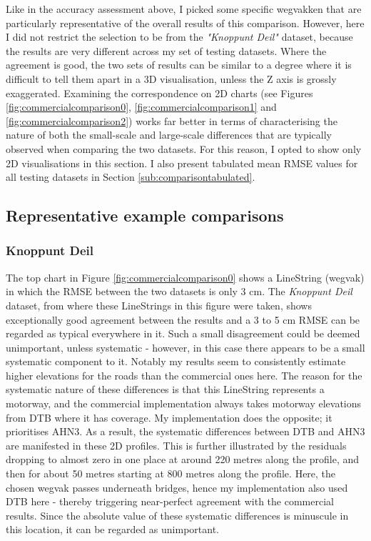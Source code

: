 Like in the accuracy assessment above, I picked some specific wegvakken that are particularly representative of the overall results of this comparison. However, here I did not restrict the selection to be from the \textit{"Knoppunt Deil"} dataset, because the results are very different across my set of testing datasets. Where the agreement is good, the two sets of results can be similar to a degree where it is difficult to tell them apart in a 3D visualisation, unless the Z axis is grossly exaggerated. Examining the correspondence on 2D charts (see Figures \ref{fig:commercialcomparison0}, \ref{fig:commercialcomparison1} and \ref{fig:commercialcomparison2}) works far better in terms of characterising the nature of both the small-scale and large-scale differences that are typically observed when comparing the two datasets. For this reason, I opted to show only 2D visualisations in this section. I also present tabulated mean RMSE values for all testing datasets in Section \ref{sub:comparisontabulated}.

\subsection{Representative example comparisons}
\label{sub:comparisonexamples}

\subsubsection{Knoppunt Deil}

The top chart in Figure \ref{fig:commercialcomparison0} shows a LineString (wegvak) in which the RMSE between the two datasets is only 3 cm. The \textit{Knoppunt Deil} dataset, from where these LineStrings in this figure were taken, shows exceptionally good agreement between the results and a 3 to 5 cm RMSE can be regarded as typical everywhere in it. Such a small disagreement could be deemed unimportant, unless systematic - however, in this case there appears to be a small systematic component to it. Notably my results seem to consistently estimate higher elevations for the roads than the commercial ones here. The reason for the systematic nature of these differences is that this LineString represents a motorway, and the commercial implementation always takes motorway elevations from DTB where it has coverage. My implementation does the opposite; it prioritises AHN3. As a result, the systematic differences between DTB and AHN3 are manifested in these 2D profiles. This is further illustrated by the residuals dropping to almost zero in one place at around 220 metres along the profile, and then for about 50 metres starting at 800 metres along the profile. Here, the chosen wegvak passes underneath bridges, hence my implementation also used DTB here - thereby triggering near-perfect agreement with the commercial results. Since the absolute value of these systematic differences is minuscule in this location, it can be regarded as unimportant.

